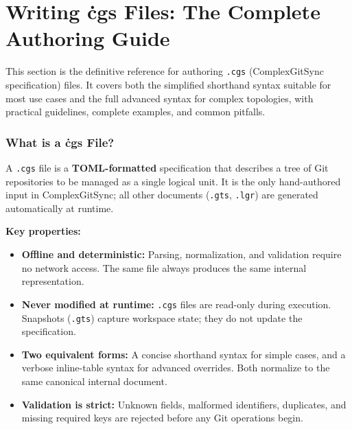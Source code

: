 \chapter{Writing \.cgs Files: The Complete Authoring Guide}
\label{chap:cgs-authoring}

This section is the definitive reference for authoring \texttt{.cgs} (ComplexGitSync
specification) files. It covers both the simplified shorthand syntax suitable for
most use cases and the full advanced syntax for complex topologies, with practical
guidelines, complete examples, and common pitfalls.

\subsection{What is a \.cgs File?}

A \texttt{.cgs} file is a \textbf{TOML-formatted} specification that describes a tree
of Git repositories to be managed as a single logical unit. It is the only
hand-authored input in ComplexGitSync; all other documents (\texttt{.gts},
\texttt{.lgr}) are generated automatically at runtime.

\textbf{Key properties:}

\begin{itemize}
  \item \textbf{Offline and deterministic:} Parsing, normalization, and validation
        require no network access. The same file always produces the same
        internal representation.
  \item \textbf{Never modified at runtime:} \texttt{.cgs} files are read-only during
        execution. Snapshots (\texttt{.gts}) capture workspace state; they do not
        update the specification.
  \item \textbf{Two equivalent forms:} A concise shorthand syntax for simple cases,
        and a verbose inline-table syntax for advanced overrides. Both normalize
        to the same canonical internal document.
  \item \textbf{Validation is strict:} Unknown fields, malformed identifiers, duplicates,
        and missing required keys are rejected before any Git operations begin.
\end{itemize}

